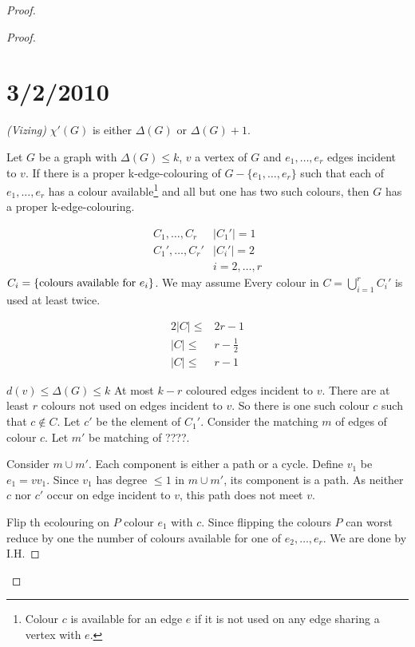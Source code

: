 \documentclass{article}
\begin{document}
\begin{proof}
\begin{proof}
\section*{3/2/2010}
\begin{thm}
\emph{(Vizing)} $\chi'(G)$ is either $\Delta(G)$ or $\Delta(G)+1$.
\end{thm}

\begin{lem}
Let $G$ be a graph with $\Delta(G) \leq k$, $v$ a vertex of $G$ and $e_1, \ldots, e_r$ edges incident to $v$.  If there is a proper k-edge-colouring of $G-\{e_1,\ldots,e_r\}$ such that each of $e_1,\ldots,e_r$ has a colour available\footnote{Colour $c$ is available for an edge $e$ if it is not used on any edge sharing a vertex with $e$.} and all but one has two such colours, then $G$ has a proper k-edge-colouring.
\end{lem}

\[\begin{array}{ll}
C_1,\ldots,C_r  & |C_1'|=1 \\
C_1',\ldots,C_r' & |C_i'| =2  \\
& i = 2,\ldots, r
\end{array}\]
$C_i=\{\textmd{colours available for } e_i\}$.  We may assume Every colour in $C=\displaystyle \bigcup_{i=1}^r C_i'$ is used at least twice.  

\begin{align*}
2|C| \leq& 2r-1 \\
|C| \leq& r-\frac{1}{2}\\
|C| \leq & r-1
\end{align*}


$d(v) \leq \Delta(G) \leq k$ At most $k-r$ coloured edges incident to $v$.  There are at least $r$ colours not used on edges incident to $v$.  So there is one such colour $c$ such that $c \notin C$.  Let $c'$ be the element of $C_1'$.  Consider the matching $m$ of edges of colour $c$. Let $m'$ be matching of ????.

Consider $m \cup m'$.  Each component is either a path or a cycle. Define $v_1$ be $e_1 = vv_1$.   Since $v_1$ has degree $\leq 1$ in $m \cup m'$, its component is a path.  As neither $c$ nor $c'$ occur on edge incident to $v$, this path does not meet $v$.

Flip th ecolouring on $P$ colour $e_1$ with $c$.  Since flipping the colours $P$ can worst reduce by one the number of colours available for one of $e_2,\ldots,e_r$.  We are done by I.H.
\end{proof}
\end{proof}
\end{document}
